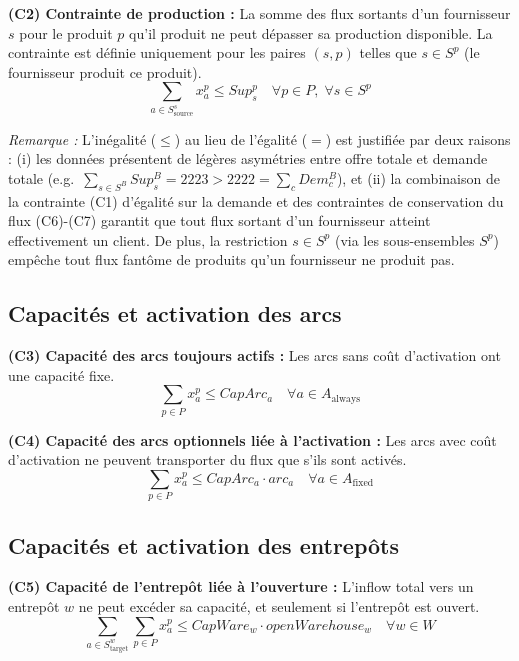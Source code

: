 \documentclass{article}
\begin{document}
\noindent\textbf{(C2) Contrainte de production :}
La somme des flux sortants d'un fournisseur $s$ pour le produit $p$ qu'il produit ne peut dépasser
sa production disponible. La contrainte est définie uniquement pour les paires $(s, p)$ telles que
$s \in S^p$ (le fournisseur produit ce produit).
\begin{equation}
    \sum_{a \in S_{\text{source}}^s} x_a^p \le Sup_s^p \quad \forall p \in P,\; \forall s \in S^p
    \label{eq:supply}
\end{equation}

\noindent\textit{Remarque :} L'inégalité ($\le$) au lieu de l'égalité ($=$) est justifiée par
deux raisons : (i) les données présentent de légères asymétries entre offre totale et demande totale
(e.g.\ $\sum_{s \in S^B} Sup_s^B = 2223 > 2222 = \sum_c Dem_c^B$), et (ii) la combinaison de
la contrainte (C1) d'égalité sur la demande et des contraintes de conservation du flux (C6)-(C7)
garantit que tout flux sortant d'un fournisseur atteint effectivement un client.
De plus, la restriction $s \in S^p$ (via les sous-ensembles $S^p$) empêche tout flux
fantôme de produits qu'un fournisseur ne produit pas.

\subsection{Capacités et activation des arcs}

\noindent\textbf{(C3) Capacité des arcs toujours actifs :}
Les arcs sans coût d'activation ont une capacité fixe.
\begin{equation}
    \sum_{p \in P} x_a^p \le CapArc_a \quad \forall a \in A_{\text{always}} \label{eq:arc_cap_always}
\end{equation}

\noindent\textbf{(C4) Capacité des arcs optionnels liée à l'activation :}
Les arcs avec coût d'activation ne peuvent transporter du flux que s'ils sont activés.
\begin{equation}
    \sum_{p \in P} x_a^p \le CapArc_a \cdot arc_a \quad \forall a \in A_{\text{fixed}} \label{eq:arc_cap_fixed}
\end{equation}

\subsection{Capacités et activation des entrepôts}

\noindent\textbf{(C5) Capacité de l'entrepôt liée à l'ouverture :}
L'inflow total vers un entrepôt $w$ ne peut excéder sa capacité, et seulement si l'entrepôt est ouvert.
\begin{equation}
    \sum_{a \in S_{\text{target}}^w} \sum_{p \in P} x_a^p \le CapWare_w \cdot openWarehouse_w \quad \forall w \in W \label{eq:wh_cap}
\end{equation}
\end{document}

